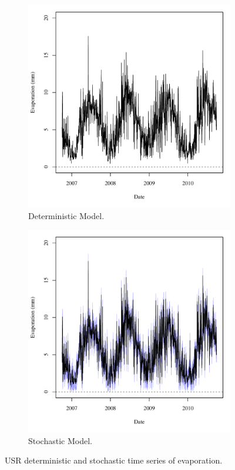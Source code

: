 \begin{linenumbers}
\begin{figure}[htbp]
\centering
	\begin{subfigure}{0.5\textwidth}
		\includegraphics[width=0.9\linewidth]{"Figures/Results_DUSR/A Evap"}
		\caption{Deterministic Model.}
		\label{sub:USREvapD}
	\end{subfigure}%
	\begin{subfigure}{0.5\textwidth}
		\includegraphics[width=0.9\linewidth]{"Figures/Results_USR/A Evap"}
		\caption{Stochastic Model.}
		\label{sub:USREvapS}
	\end{subfigure}
	\caption[USR deterministic and stochastic time series of evaporation.]{USR deterministic and stochastic time series of evaporation.}
	\label{fig:USREvap}
\end{figure}


\end{linenumbers}
